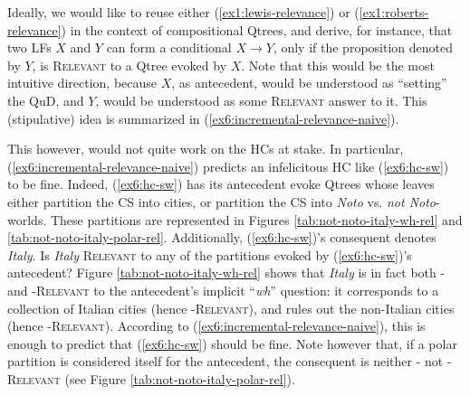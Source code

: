 Ideally, we would like to reuse either (\ref{ex1:lewis-relevance}) or (\ref{ex1:roberts-relevance}) in the context of compositional Qtrees, and derive, for instance, that two LFs $X$ and $Y$ can form a conditional $X \rightarrow Y$, only if the proposition denoted by $Y$, is \textsc{Relevant} to a Qtree evoked by $X$. Note that this would be the most intuitive direction, because $X$, as antecedent, would be understood as ``setting'' the QuD, and $Y$, would be understood as some \textsc{Relevant} answer to it. This (stipulative) idea is summarized in (\ref{ex6:incremental-relevance-naive}).

\begin{exe}
	\label{ex6:incremental-relevance-naive}
\end{exe}

This however, would not quite work on the HCs at stake. In particular, (\ref{ex6:incremental-relevance-naive}) predicts an infelicitous HC like (\ref{ex6:hc-sw}) to be fine. Indeed, (\ref{ex6:hc-sw}) has its antecedent evoke Qtrees whose leaves either partition the CS into cities, or partition the CS into \textit{Noto} vs. \textit{not Noto}-worlds. These partitions are represented in Figures \ref{tab:not-noto-italy-wh-rel} and \ref{tab:not-noto-italy-polar-rel}. Additionally, (\ref{ex6:hc-sw})'s consequent denotes \textit{Italy}. Is \textit{Italy} \textsc{Relevant} to any of the partitions evoked by (\ref{ex6:hc-sw})'s antecedent? Figure \ref{tab:not-noto-italy-wh-rel} shows that \textit{Italy} is in fact both \textsc{\citeauthor{Lewis1988}-} and \textsc{\citeauthor{Roberts2012}-Relevant} to the antecedent's implicit ``\textit{wh}'' question: it corresponds to a collection of Italian cities (hence \textsc{\citeauthor{Lewis1988}-Relevant}), and rules out the non-Italian cities (hence \textsc{\citeauthor{Roberts2012}-Relevant}). According to (\ref{ex6:incremental-relevance-naive}), this is enough to predict that (\ref{ex6:hc-sw}) should be fine. Note however that, if a polar partition is considered itself for the antecedent, the consequent is neither \textsc{\citeauthor{Lewis1988}-} not \textsc{\citeauthor{Roberts2012}-Relevant} (see Figure \ref{tab:not-noto-italy-polar-rel}).

